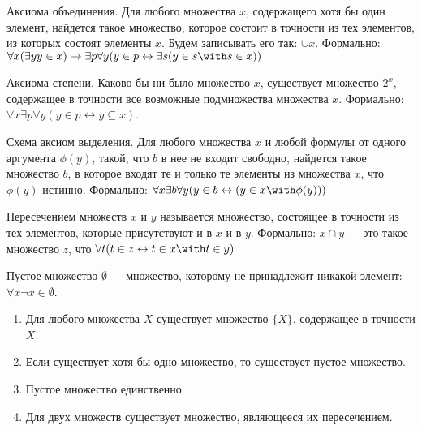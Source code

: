 \begin{axiom}{Аксиома объединения.}
Для любого множества $x$, содержащего хотя бы один элемент, найдется такое множество, которое состоит в точности
из тех элементов, из которых состоят элементы $x$. Будем записывать его так: $\cup x$.
Формально: $\forall x (\exists y y \in x) \rightarrow \exists p \forall y (y \in p \leftrightarrow \exists s (y \in s \with s \in x))$
\end{axiom}

\begin{axiom}{Аксиома степени.}
Каково бы ни было множество $x$, существует множество $2^x$, содержащее в точности
все возможные подмножества множества $x$.
Формально: $\forall x \exists p \forall y (y \in p \leftrightarrow y \subseteq x)$.
\end{axiom}

\begin{axiom}{Схема аксиом выделения.}
Для любого множества $x$ и любой формулы от одного аргумента $\phi(y)$, такой, что
$b$ в нее не входит свободно, найдется такое множество $b$, в которое
входят те и только те элементы из множества $x$, что $\phi(y)$ истинно.
Формально: $\forall x \exists b \forall y (y \in b \leftrightarrow (y \in x \with \phi(y)))$
\end{axiom}

\begin{definition}Пересечением множеств $x$ и $y$ называется множество, состоящее
в точности из тех элементов, которые присутствуют и в $x$ и в $y$. Формально:
$x \cap y$ --- это такое множество $z$, что $\forall t (t \in z \leftrightarrow t \in x \with t \in y)$
\end{definition}

\begin{definition}Пустое множество $\emptyset$ --- множество, которому не принадлежит
никакой элемент: $\forall x \neg x \in \emptyset$.
\end{definition}

\begin{theorem}\begin{enumerate}
\item Для любого множества $X$ существует множество $\{X\}$, содержащее в точности $X$.
\item Если существует хотя бы одно множество, то существует пустое множество.
\item Пустое множество единственно.
\item Для двух множеств существует множество, являющееся их пересечением.
\end{enumerate}\end{theorem}

